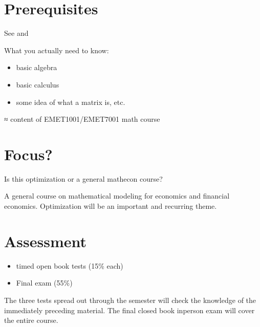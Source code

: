 \documentclass[letterpaper,10pt,english]{jupyterBook}
\begin{document}
\section{Prerequisites}
\label{\detokenize{01.introduction:prerequisites}}
\sphinxAtStartPar
See  and

\sphinxAtStartPar
What you actually need to know:
\begin{itemize}
\item {} 
\sphinxAtStartPar
basic algebra

\item {} 
\sphinxAtStartPar
basic calculus

\item {} 
\sphinxAtStartPar
some idea of what a matrix is, etc.

\end{itemize}

\sphinxAtStartPar
≈ content of EMET1001/EMET7001 math course


\section{Focus?}
\label{\detokenize{01.introduction:focus}}
\sphinxAtStartPar
{} Is this optimization or a general math\sphinxhyphen{}econ course?

\sphinxAtStartPar
{} A general course on mathematical modeling for economics and financial economics. Optimization will be an important and recurring theme.


\section{Assessment}
\label{\detokenize{01.introduction:assessment}}\begin{itemize}
\item {} 
 timed open book tests (15\% each)

\item {} 
\sphinxAtStartPar
Final exam (55\%)

\end{itemize}

\sphinxAtStartPar
The three tests spread out through the semester will check the knowledge of the immediately preceding material. The final closed book in\sphinxhyphen{}person exam will cover the entire course.
\end{document}
